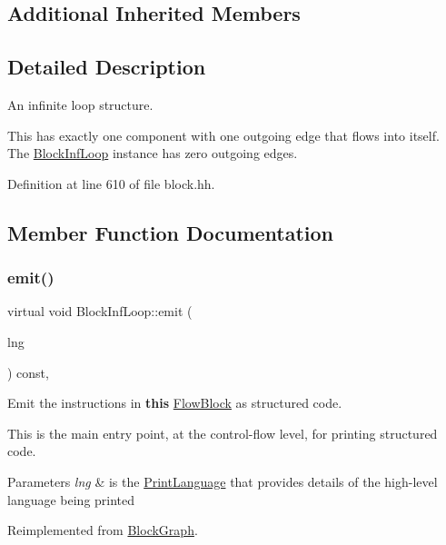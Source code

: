 \subsection*{Additional Inherited Members}


\subsection{Detailed Description}
An infinite loop structure. 

This has exactly one component with one outgoing edge that flows into itself. The \mbox{\hyperlink{class_block_inf_loop}{Block\+Inf\+Loop}} instance has zero outgoing edges. 

Definition at line 610 of file block.\+hh.



\subsection{Member Function Documentation}
\mbox{\label{class_block_inf_loop_aa86634144acbb9f7b6b580b9f4566bfe}} 
\subsubsection{\texorpdfstring{emit()}{emit()}}
{\footnotesize\ttfamily virtual void Block\+Inf\+Loop\+::emit (\begin{DoxyParamCaption}\item[{\mbox{\hyperlink{class_print_language}{Print\+Language}} $\ast$}]{lng }\end{DoxyParamCaption}) const\hspace{0.3cm}{\ttfamily [inline]}, {\ttfamily [virtual]}}



Emit the instructions in {\bfseries{this}} \mbox{\hyperlink{class_flow_block}{Flow\+Block}} as structured code. 

This is the main entry point, at the control-\/flow level, for printing structured code. 
\begin{DoxyParams}{Parameters}
{\em lng} & is the \mbox{\hyperlink{class_print_language}{Print\+Language}} that provides details of the high-\/level language being printed \\
\hline
\end{DoxyParams}


Reimplemented from \mbox{\hyperlink{class_block_graph_a535d3c7cb13e5e45b6e121b024fa339f}{Block\+Graph}}.



